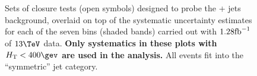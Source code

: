 \clearpage
\begin{figure}[h!]
  \begin{center}
     ~~
     \\
     ~~
     \\
    \caption{Sets of closure tests (open symbols) designed to probe
      the \znunu + jets background, overlaid on top of
      the systematic uncertainty estimates for each of the seven
      \scalht bins (shaded bands) carried out with $1.28\text{fb}^{-1}$ of
      $13\tev$ data. {\bf Only systematics in these plots with
      $\scalht<400\gev$ are used in the analysis.} All events fit 
      into the ``symmetric'' jet
      category.}
    \label{fig:ZinvclosureDataSymlt400}
  \end{center} 
\end{figure}

